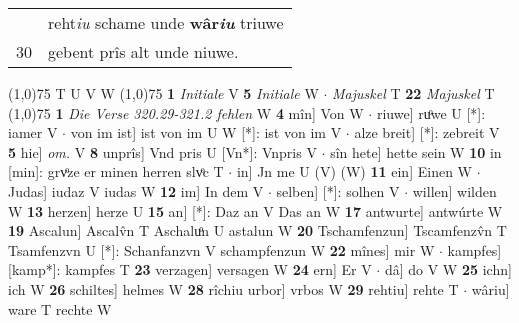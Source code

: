 \documentclass[8pt,a4paper,notitlepage]{article}
\begin{document}
\begin{table}[ht]
\begin{minipage}[t]{0.5\linewidth}
\begin{tabular}{rl}
 & reht\textit{iu} schame unde \textbf{wâr\textit{iu}} triuwe\\ 
30 & gebent prîs alt unde niuwe.\\ 
\end{tabular}
\scriptsize
\line(1,0){75} \newline
T U V W \newline
\line(1,0){75} \newline
\textbf{1} \textit{Initiale} V  \textbf{5} \textit{Initiale} W   $\cdot$ \textit{Majuskel} T  \textbf{22} \textit{Majuskel} T  \newline
\line(1,0){75} \newline
\textbf{1} \textit{Die Verse 320.29-321.2 fehlen} W  \textbf{4} mîn] Von W  $\cdot$ riuwe] ruͦwe U [*]: iamer V  $\cdot$ von im ist] ist von im U W [*]: ist von im V  $\cdot$ alze breit] [*]: zebreit V \textbf{5} hie] \textit{om.} V \textbf{8} unprîs] Vnd pris U [Vn*]: Vnpris V  $\cdot$ sîn hete] hette sein W \textbf{10} in [min]: grvͦze er minen herren slvͦc T  $\cdot$ in] Jn me U (V) (W) \textbf{11} ein] Einen W  $\cdot$ Judas] iudaz V iudas W \textbf{12} im] In dem V  $\cdot$ selben] [*]: solhen V  $\cdot$ willen] wilden W \textbf{13} herzen] herze U \textbf{15} an] [*]: Daz an V Das an W \textbf{17} antwurte] antwúrte W \textbf{19} Ascalun] Ascalv̂n T Aschaluͦn U astalun W \textbf{20} Tschamfenzun] Tscamfenzv̂n T Tsamfenzvn U [*]: Schanfanzvn V schampfenzun W \textbf{22} mînes] mir W  $\cdot$ kampfes] [kamp*]: kampfes T \textbf{23} verzagen] versagen W \textbf{24} ern] Er V  $\cdot$ dâ] do V W \textbf{25} ichn] ich W \textbf{26} schiltes] helmes W \textbf{28} rîchiu urbor] vrbos W \textbf{29} rehtiu] rehte T  $\cdot$ wâriu] ware T rechte W \newline
\end{minipage}
\end{table}
\end{document}

